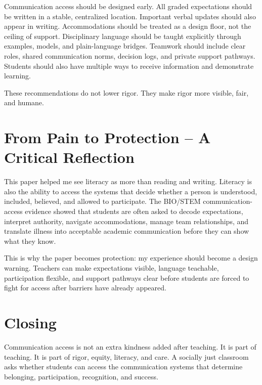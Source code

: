 Communication access should be designed early. All graded expectations should be written in a stable, centralized location. Important verbal updates should also appear in writing. Accommodations should be treated as a design floor, not the ceiling of support. Disciplinary language should be taught explicitly through examples, models, and plain-language bridges. Teamwork should include clear roles, shared communication norms, decision logs, and private support pathways. Students should also have multiple ways to receive information and demonstrate learning.

These recommendations do not lower rigor. They make rigor more visible, fair, and humane.

\section*{From Pain to Protection -- A Critical Reflection}

This paper helped me see literacy as more than reading and writing. Literacy is also the ability to access the systems that decide whether a person is understood, included, believed, and allowed to participate. The BIO/STEM communication-access evidence showed that students are often asked to decode expectations, interpret authority, navigate accommodations, manage team relationships, and translate illness into acceptable academic communication before they can show what they know.

This is why the paper becomes protection: my experience should become a design warning. Teachers can make expectations visible, language teachable, participation flexible, and support pathways clear before students are forced to fight for access after barriers have already appeared.

\section*{Closing}

Communication access is not an extra kindness added after teaching. It is part of teaching. It is part of rigor, equity, literacy, and care. A socially just classroom asks whether students can access the communication systems that determine belonging, participation, recognition, and success.
